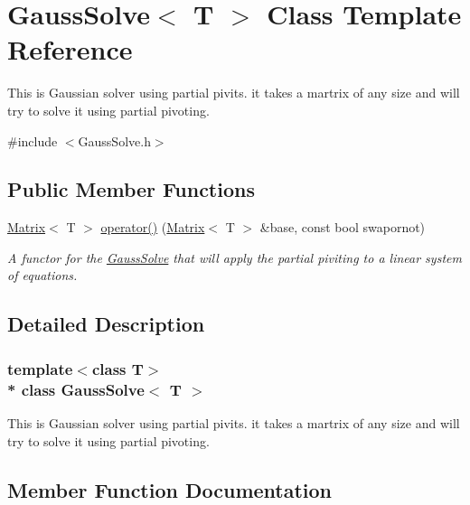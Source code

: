 \hypertarget{classGaussSolve}{}\section{Gauss\+Solve$<$ T $>$ Class Template Reference}
\label{classGaussSolve}


This is Gaussian solver using partial pivits. it takes a martrix of any size and will try to solve it using partial pivoting.  




{\ttfamily \#include $<$Gauss\+Solve.\+h$>$}

\subsection*{Public Member Functions}
\begin{DoxyCompactItemize}
\item 
\hyperlink{classMatrix}{Matrix}$<$ T $>$ \hyperlink{classGaussSolve_a5696a6833bbbf2ca02cea933b26ef090}{operator()} (\hyperlink{classMatrix}{Matrix}$<$ T $>$ \&base, const bool swapornot)
\begin{DoxyCompactList}\small\item\em A functor for the \hyperlink{classGaussSolve}{Gauss\+Solve} that will apply the partial piviting to a linear system of equations. \end{DoxyCompactList}\end{DoxyCompactItemize}


\subsection{Detailed Description}
\subsubsection*{template$<$class T$>$\\*
class Gauss\+Solve$<$ T $>$}

This is Gaussian solver using partial pivits. it takes a martrix of any size and will try to solve it using partial pivoting. 

\subsection{Member Function Documentation}
